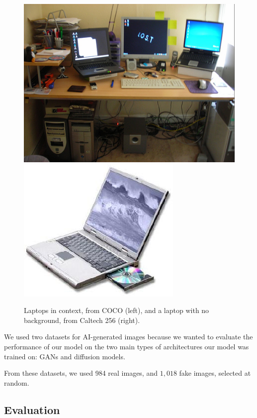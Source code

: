 \documentclass{article} %
\begin{document}
\begin{figure}[h]
    \begin{center}
        \includegraphics[scale=0.3]{figs/coco_laptop.jpg}
        \includegraphics[scale=0.45]{figs/caltech_laptop.jpg}
    \end{center}
    \caption{Laptops in context, from COCO (left), and a laptop with no background, from Caltech 256 (right).}
    \label{fig:coco_vs_caltech}
\end{figure}

We used two datasets for AI-generated images because we wanted to evaluate the performance of our model on the two main types of architectures our model was trained on: GANs and diffusion models.

From these datasets, we used 984 real images, and $1,018$ fake images, selected at random.

\subsection{Evaluation}
\end{document}
